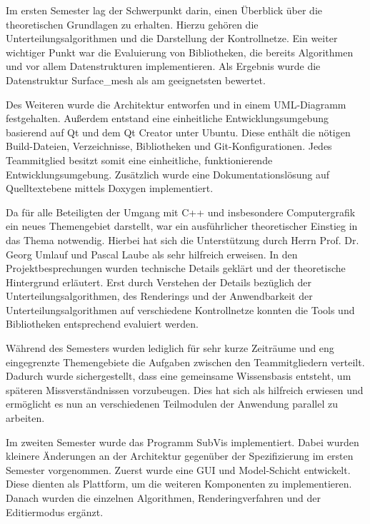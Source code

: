 Im ersten Semester lag der Schwerpunkt darin, einen Überblick über die theoretischen Grundlagen zu erhalten. 
Hierzu gehören die Unterteilungsalgorithmen und die Darstellung der Kontrollnetze.
Ein weiter wichtiger Punkt war die Evaluierung von Bibliotheken, die bereits Algorithmen und vor allem Datenstrukturen implementieren. 
Als Ergebnis wurde die Datenstruktur Surface\_mesh als am geeignetsten bewertet.

Des Weiteren wurde die Architektur entworfen und in einem UML-Diagramm festgehalten.
Außerdem entstand eine einheitliche Entwicklungsumgebung basierend auf Qt und dem Qt Creator unter Ubuntu.
Diese enthält die nötigen Build-Dateien, Verzeichnisse, Bibliotheken und Git-Konfigurationen.
Jedes Teammitglied besitzt somit eine einheitliche, funktionierende Entwicklungsumgebung.
Zusätzlich wurde eine Dokumentationslösung auf Quelltextebene mittels Doxygen implementiert.

Da für alle Beteiligten der Umgang mit C++ und insbesondere Computergrafik ein neues Themengebiet darstellt, war ein ausführlicher theoretischer Einstieg in das Thema notwendig. 
Hierbei hat sich die Unterstützung durch Herrn Prof. Dr. Georg Umlauf und Pascal Laube als sehr hilfreich erweisen.
In den Projektbesprechungen wurden technische Details geklärt und der theoretische Hintergrund erläutert.
Erst durch Verstehen der Details bezüglich der Unterteilungsalgorithmen, des Renderings und der Anwendbarkeit der Unterteilungsalgorithmen auf verschiedene Kontrollnetze konnten die Tools und Bibliotheken entsprechend evaluiert werden.

Während des Semesters wurden lediglich für sehr kurze Zeiträume und eng eingegrenzte Themengebiete die Aufgaben zwischen den Teammitgliedern verteilt.
Dadurch wurde sichergestellt, dass eine gemeinsame Wissensbasis entsteht, um späteren Missverständnissen vorzubeugen.
Dies hat sich als hilfreich erwiesen und ermöglicht es nun an verschiedenen Teilmodulen der Anwendung parallel zu arbeiten.

Im zweiten Semester wurde das Programm SubVis implementiert. 
Dabei wurden kleinere Änderungen an der Architektur gegenüber der Spezifizierung im ersten Semester vorgenommen.
Zuerst wurde eine GUI und Model-Schicht entwickelt. 
Diese dienten als Plattform, um die weiteren Komponenten zu implementieren.
Danach wurden die einzelnen Algorithmen, Renderingverfahren und der Editiermodus ergänzt.


